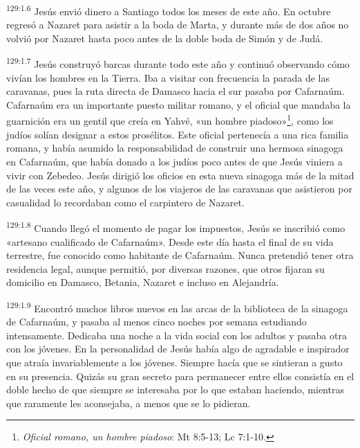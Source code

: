 \par
\textsuperscript{129:1.6} Jesús envió dinero a Santiago todos los meses de este año. En octubre regresó a Nazaret para asistir a la boda de Marta, y durante más de dos años no volvió por Nazaret hasta poco antes de la doble boda de Simón y de Judá.

\par
\textsuperscript{129:1.7} Jesús construyó barcas durante todo este año y continuó observando cómo vivían los hombres en la Tierra. Iba a visitar con frecuencia la parada de las caravanas, pues la ruta directa de Damasco hacia el sur pasaba por Cafarnaúm. Cafarnaúm era un importante puesto militar romano, y el oficial que mandaba la guarnición era un gentil que creía en Yahvé, «un hombre piadoso»\footnote{\textit{Oficial romano, un hombre piadoso}: Mt 8:5-13; Lc 7:1-10.}, como los judíos solían designar a estos prosélitos. Este oficial pertenecía a una rica familia romana, y había asumido la responsabilidad de construir una hermosa sinagoga en Cafarnaúm, que había donado a los judíos poco antes de que Jesús viniera a vivir con Zebedeo. Jesús dirigió los oficios en esta nueva sinagoga más de la mitad de las veces este año, y algunos de los viajeros de las caravanas que asistieron por casualidad lo recordaban como el carpintero de Nazaret.

\par
\textsuperscript{129:1.8} Cuando llegó el momento de pagar los impuestos, Jesús se inscribió como «artesano cualificado de Cafarnaúm». Desde este día hasta el final de su vida terrestre, fue conocido como habitante de Cafarnaúm. Nunca pretendió tener otra residencia legal, aunque permitió, por diversas razones, que otros fijaran su domicilio en Damasco, Betania, Nazaret e incluso en Alejandría.

\par
\textsuperscript{129:1.9} Encontró muchos libros nuevos en las arcas de la biblioteca de la sinagoga de Cafarnaúm, y pasaba al menos cinco noches por semana estudiando intensamente. Dedicaba una noche a la vida social con los adultos y pasaba otra con los jóvenes. En la personalidad de Jesús había algo de agradable e inspirador que atraía invariablemente a los jóvenes. Siempre hacía que se sintieran a gusto en su presencia. Quizás su gran secreto para permanecer entre ellos consistía en el doble hecho de que siempre se interesaba por lo que estaban haciendo, mientras que raramente les aconsejaba, a menos que se lo pidieran.

